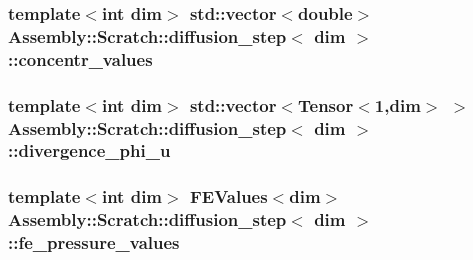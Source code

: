 \subsubsection[{concentr\+\_\+values}]{\setlength{\rightskip}{0pt plus 5cm}template$<$int dim$>$ std\+::vector$<$double$>$ {\bf Assembly\+::\+Scratch\+::diffusion\+\_\+step}$<$ dim $>$\+::concentr\+\_\+values}\label{struct_assembly_1_1_scratch_1_1diffusion__step_a2ee9059b21d32ee414bdf8eb96d3c451}
\hypertarget{struct_assembly_1_1_scratch_1_1diffusion__step_a78dbb9aa70e10f4e3400a7ea8df0395f}{}
\subsubsection[{divergence\+\_\+phi\+\_\+u}]{\setlength{\rightskip}{0pt plus 5cm}template$<$int dim$>$ std\+::vector$<$Tensor$<$1,dim$>$ $>$ {\bf Assembly\+::\+Scratch\+::diffusion\+\_\+step}$<$ dim $>$\+::divergence\+\_\+phi\+\_\+u}\label{struct_assembly_1_1_scratch_1_1diffusion__step_a78dbb9aa70e10f4e3400a7ea8df0395f}
\hypertarget{struct_assembly_1_1_scratch_1_1diffusion__step_a8ae6347dd8bec8156be7f56235d7a10f}{}
\subsubsection[{fe\+\_\+pressure\+\_\+values}]{\setlength{\rightskip}{0pt plus 5cm}template$<$int dim$>$ F\+E\+Values$<$dim$>$ {\bf Assembly\+::\+Scratch\+::diffusion\+\_\+step}$<$ dim $>$\+::fe\+\_\+pressure\+\_\+values}\label{struct_assembly_1_1_scratch_1_1diffusion__step_a8ae6347dd8bec8156be7f56235d7a10f}
\hypertarget{struct_assembly_1_1_scratch_1_1diffusion__step_abc801170e70dc1174e7570a16a9c9cef}{}
